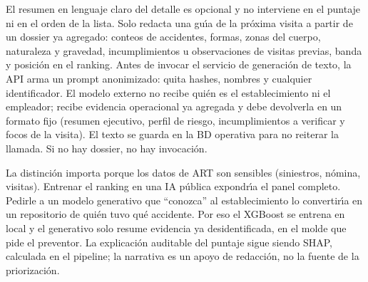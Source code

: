 El resumen en lenguaje claro del detalle es opcional y no interviene en el puntaje ni en el orden de la lista.
Solo redacta una gu\'{\i}a de la pr\'oxima visita a partir de un dossier ya agregado: conteos de accidentes, formas, zonas del cuerpo, naturaleza y gravedad, incumplimientos u observaciones de visitas previas, banda y posici\'on en el ranking.
Antes de invocar el servicio de generaci\'on de texto, la API arma un prompt anonimizado: quita hashes, nombres y cualquier identificador.
El modelo externo no recibe qui\'en es el establecimiento ni el empleador; recibe evidencia operacional ya agregada y debe devolverla en un formato fijo (resumen ejecutivo, perfil de riesgo, incumplimientos a verificar y focos de la visita).
El texto se guarda en la BD operativa para no reiterar la llamada.
Si no hay dossier, no hay invocaci\'on.


La distinci\'on importa porque los datos de ART son sensibles (siniestros, n\'omina, visitas).
Entrenar el ranking en una IA p\'ublica expondr\'{\i}a el panel completo.
Pedirle a un modelo generativo que ``conozca'' al establecimiento lo convertir\'{\i}a en un repositorio de qui\'en tuvo qu\'e accidente.
Por eso el XGBoost se entrena en local y el generativo solo resume evidencia ya desidentificada, en el molde que pide el preventor.
La explicaci\'on auditable del puntaje sigue siendo SHAP, calculada en el pipeline; la narrativa es un apoyo de redacci\'on, no la fuente de la priorizaci\'on.

\subsection*{}

